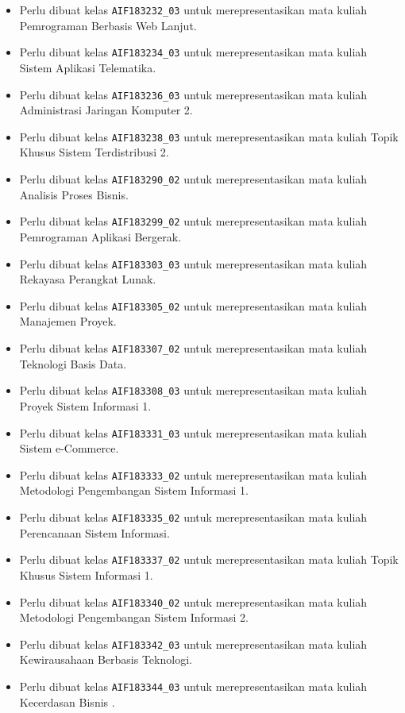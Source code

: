 \begin{enumerate}
\begin{itemize}
		\item Perlu dibuat kelas \texttt{AIF183232\_03} untuk merepresentasikan mata kuliah Pemrograman Berbasis Web Lanjut.
		\item Perlu dibuat kelas \texttt{AIF183234\_03} untuk merepresentasikan mata kuliah Sistem Aplikasi Telematika.
		\item Perlu dibuat kelas \texttt{AIF183236\_03} untuk merepresentasikan mata kuliah Administrasi Jaringan Komputer 2.
		\item Perlu dibuat kelas \texttt{AIF183238\_03} untuk merepresentasikan mata kuliah Topik Khusus Sistem Terdistribusi 2.
		\item Perlu dibuat kelas \texttt{AIF183290\_02} untuk merepresentasikan mata kuliah Analisis Proses Bisnis.
		\item Perlu dibuat kelas \texttt{AIF183299\_02} untuk merepresentasikan mata kuliah Pemrograman Aplikasi Bergerak.
		\item Perlu dibuat kelas \texttt{AIF183303\_03} untuk merepresentasikan mata kuliah Rekayasa Perangkat Lunak.
		\item Perlu dibuat kelas \texttt{AIF183305\_02} untuk merepresentasikan mata kuliah Manajemen Proyek.
		\item Perlu dibuat kelas \texttt{AIF183307\_02} untuk merepresentasikan mata kuliah Teknologi Basis Data.
		\item Perlu dibuat kelas \texttt{AIF183308\_03} untuk merepresentasikan mata kuliah Proyek Sistem Informasi 1.
		\item Perlu dibuat kelas \texttt{AIF183331\_03} untuk merepresentasikan mata kuliah Sistem e-Commerce.
		\item Perlu dibuat kelas \texttt{AIF183333\_02} untuk merepresentasikan mata kuliah Metodologi Pengembangan Sistem Informasi 1.
		\item Perlu dibuat kelas \texttt{AIF183335\_02} untuk merepresentasikan mata kuliah Perencanaan Sistem Informasi.
		\item Perlu dibuat kelas \texttt{AIF183337\_02} untuk merepresentasikan mata kuliah Topik Khusus Sistem Informasi 1.
		\item Perlu dibuat kelas \texttt{AIF183340\_02} untuk merepresentasikan mata kuliah Metodologi Pengembangan Sistem Informasi 2.
		\item Perlu dibuat kelas \texttt{AIF183342\_03} untuk merepresentasikan mata kuliah Kewirausahaan Berbasis Teknologi.
		\item Perlu dibuat kelas \texttt{AIF183344\_03} untuk merepresentasikan mata kuliah Kecerdasan Bisnis .

\end{itemize}
\end{enumerate}
